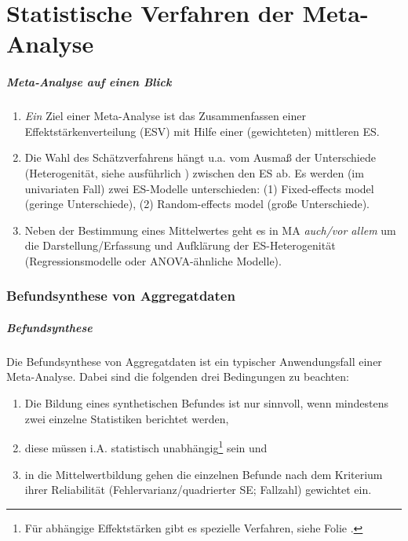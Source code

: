 \part{Statistische Verfahren der Meta-Analyse}\label{part:datenanalyse}

\frame{\partpage}


\begin{frame}
  \frametitle{Meta-Analyse auf einen Blick}
  \begin{enumerate}
  \item \emph{Ein} Ziel einer Meta-Analyse ist das Zusammenfassen einer
    Effektstärkenverteilung (ESV) mit Hilfe einer (gewichteten) mittleren ES.
  \item Die Wahl des Schätzverfahrens hängt u.a. vom Ausmaß der Unterschiede
    (Heterogenität, siehe ausführlich \pageref{fr:heterodef}) zwischen
    den ES ab. Es werden (im univariaten Fall) zwei ES-Modelle unterschieden:
    (1) Fixed-effects model (geringe Unterschiede), (2) Random-effects model
    (große Unterschiede).
  \item Neben der Bestimmung eines Mittelwertes geht es in MA \emph{auch/vor
      allem} um die Darstellung/Erfassung und Aufklärung der ES-Heterogenität
    (Regressionsmodelle oder ANOVA-ähnliche Modelle).
  \end{enumerate}
\end{frame}



\section{Befundsynthese von Aggregatdaten}


\begin{frame}
  \frametitle{Befundsynthese} Die Befundsynthese von Aggregatdaten ist ein
  typischer Anwendungsfall einer Meta-Analyse. Dabei sind die folgenden drei
  Bedingungen zu beachten:
  \begin{enumerate}
  \item Die Bildung eines synthetischen Befundes ist nur sinnvoll, wenn
    mindestens zwei einzelne Statistiken berichtet werden,
  \item diese müssen i.A. statistisch unabhängig\footnote{Für abhängige Effektstärken
      gibt es spezielle Verfahren, siehe Folie \pageref{slide:abhaeng-es}.} sein und
  \item in die Mittelwertbildung gehen die einzelnen Befunde nach dem Kriterium
    ihrer Reliabilität (Fehlervarianz/quadrierter SE; Fallzahl) gewichtet ein.
  \end{enumerate}
\end{frame}




